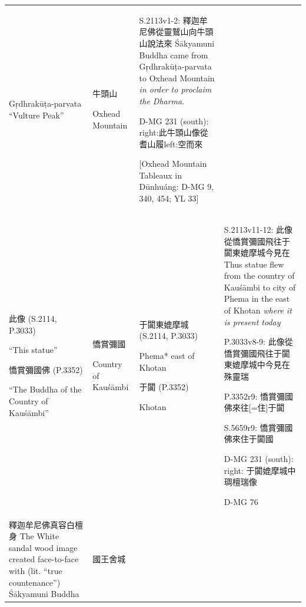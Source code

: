 \documentclass[
  english,
  a4paper,
  DIV=12,
  footlines=2.1,
  usegeometry=true]{scrartcl}
\begin{document}
\begin{longtable}[]{@{}llll@{}}
\begin{minipage}[t]{0.13\columnwidth}
Gṛdhrakūṭa-parvata ``Vulture Peak''\strut
\end{minipage} & \begin{minipage}[t]{0.13\columnwidth}\raggedright
牛頭山

Oxhead Mountain\strut
\end{minipage} & \begin{minipage}[t]{0.44\columnwidth}\raggedright
S.2113v1-2: 釋迦牟尼佛從靈鷲山向牛頭山說法來 Śākyamuni Buddha came from
Gṛdhrakūṭa-parvata to Oxhead Mountain \emph{in order to proclaim the
Dharma}.

D-MG 231 (south): right:此牛頭山像從耆山履left:空而來

{[}Oxhead Mountain Tableaux in Dūnhuáng: D-MG 9, 340, 454; YL
33{]}\strut
\end{minipage}\tabularnewline
\begin{minipage}[t]{0.18\columnwidth}\raggedright
此像 (S.2114, P.3033)

``This statue''

憍賞彌國佛 (P.3352)

``The Buddha of the Country of Kauśāmbi''\strut
\end{minipage} & \begin{minipage}[t]{0.13\columnwidth}\raggedright
憍賞彌國

Country of Kauśāmbi\strut
\end{minipage} & \begin{minipage}[t]{0.13\columnwidth}\raggedright
于闐東媲摩城 (S.2114, P.3033)

Phema* east of Khotan

于闐 (P.3352)

Khotan\strut
\end{minipage} & \begin{minipage}[t]{0.44\columnwidth}\raggedright
S.2113v11-12: 此像從憍賞彌國飛往于闐東媲摩城今見在 Thus statue flew from
the country of Kauśāmbi to city of Phema in the east of Khotan
\emph{where it is present today}

P.3033v8-9: 此像從憍賞彌國飛往于闐東媲摩城中今見在殊靈瑞

P.3352r9: 憍賞彌國佛來往{[}=住{]}于闐

S.5659r9: 憍賞彌國佛來住于闐國

D-MG 231 (south): right: 于闐媲摩城中琱檀瑞像

D-MG 76\strut
\end{minipage}\tabularnewline
\begin{minipage}[t]{0.18\columnwidth}\raggedright
釋迦牟尼佛真容白檀身 The White sandal wood image created face-to-face
with (lit. ``true countenance'') Śākyamuni Buddha\strut
\end{minipage} & \begin{minipage}[t]{0.13\columnwidth}\raggedright
國王舍城


\end{minipage}
\end{longtable}
\end{document}

